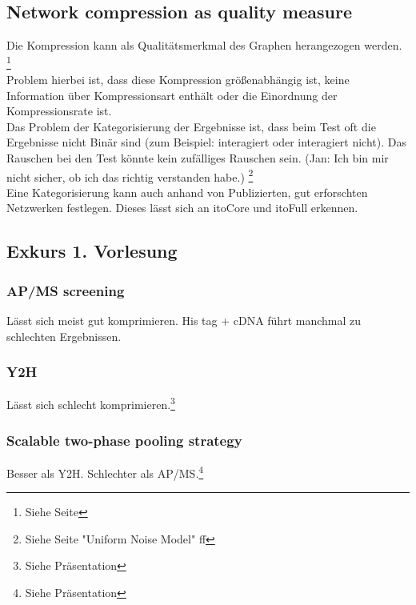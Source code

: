 \documentclass{article}
\begin{document}
\subsection{Network compression as quality measure}
Die Kompression kann als Qualitätsmerkmal des Graphen herangezogen werden.
\footnote{Siehe Seite}\\
Problem hierbei ist, dass diese Kompression  größenabhängig ist, keine
Information über Kompressionsart enthält oder die Einordnung der Kompressionsrate
ist. \\
Das Problem der Kategorisierung der Ergebnisse ist, dass beim Test oft die
Ergebnisse nicht Binär sind (zum Beispiel: interagiert oder interagiert nicht).
Das Rauschen bei den Test könnte kein zufälliges Rauschen sein. (Jan: Ich bin
mir nicht sicher, ob ich das richtig verstanden habe.)
\footnote{Siehe Seite "Uniform Noise Model" ff}\\
Eine Kategorisierung kann auch anhand von Publizierten, gut erforschten Netzwerken
festlegen. Dieses lässt sich an itoCore und itoFull erkennen.\\

\subsection{Exkurs 1. Vorlesung}
\subsubsection{AP/MS screening}
Lässt sich meist gut komprimieren. His tag + cDNA führt manchmal zu schlechten
Ergebnissen.
\subsubsection{Y2H}
Lässt sich schlecht komprimieren.\footnote{Siehe Präsentation}
\subsubsection{Scalable two-phase pooling strategy}
Besser als Y2H. Schlechter als AP/MS.\footnote{Siehe Präsentation}
\end{document}
